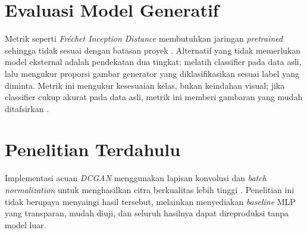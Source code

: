 \section{Evaluasi Model Generatif}

Metrik seperti \textit{Fr\'echet Inception Distance} membutuhkan jaringan \textit{pretrained} sehingga tidak sesuai dengan batasan proyek \citep{heusel2017gans}. Alternatif yang tidak memerlukan model eksternal adalah pendekatan dua tingkat: melatih classifier pada data asli, lalu mengukur proporsi gambar generator yang diklasifikasikan sesuai label yang diminta. Metrik ini mengukur kesesuaian kelas, bukan keindahan visual; jika classifier cukup akurat pada data asli, metrik ini memberi gambaran yang mudah ditafsirkan \citep{salimans2016improved}.

\section{Penelitian Terdahulu}

Implementasi acuan \textit{DCGAN} menggunakan lapisan konvolusi dan \textit{batch normalization} \citep{ioffe2015batchnorm} untuk menghasilkan citra berkualitas lebih tinggi \citep{radford2015dcgan}. Penelitian ini tidak berupaya menyaingi hasil tersebut, melainkan menyediakan \textit{baseline} MLP yang transparan, mudah diuji, dan seluruh hasilnya dapat direproduksi tanpa model luar.
